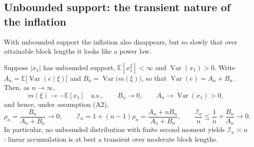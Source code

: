 \documentclass[twocolumn,review,hidelinks,oneeqnum,onetabnum,onefignum,onethmnum]{siamart251216}
\begin{document}
\subsection{Unbounded support: the transient nature of the inflation}
\label{sec:open}

With unbounded support the inflation also disappears, but so slowly that over
attainable block lengths it looks like a power law.

\begin{proposition}
\label{prop:decay}
Suppose $|x_1|$ has unbounded support, $\mathbb E[x_1^2]<\infty$ and
$\operatorname{Var}(x_1)>0$. Write
$A_n=\mathbb E\bigl[\operatorname{Var}(e\mid\xi)\bigr]$ and
$B_n=\operatorname{Var}\bigl(m(\xi)\bigr)$, so that
$\operatorname{Var}(e)=A_n+B_n$. Then, as $n\to\infty$,
\begin{equation}
m(\xi)\longrightarrow-\mathbb E[x_1]\quad\text{a.s.},\qquad
B_n\longrightarrow0,\qquad
A_n\longrightarrow\operatorname{Var}(x_1)>0 ,
\label{eq:decay}
\end{equation}
and hence, under assumption (A2),
\begin{equation}
\rho_n=\frac{B_n}{A_n+B_n}\longrightarrow0,
\qquad
\mathcal I_n=1+(n-1)\rho_n=\frac{A_n+nB_n}{A_n+B_n},
\qquad
\frac{\mathcal I_n}{n}\le\frac1n+\frac{B_n}{A_n}\longrightarrow0 .
\label{eq:decay2}
\end{equation}
In particular, no unbounded distribution with finite second moment yields
$\mathcal I_n\asymp n$: linear accumulation is at best a transient over moderate
block lengths.
\end{proposition}
\end{document}
